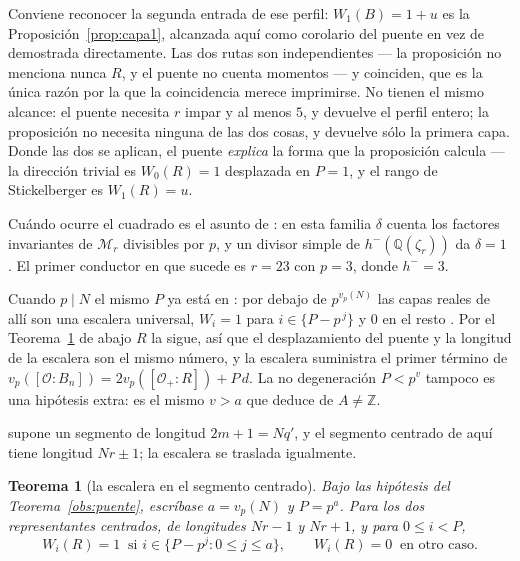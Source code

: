 \documentclass[11pt,a4paper]{article}
\newtheorem{theorem}{Teorema}
\theoremstyle{definition}
\newcommand{\ZZ}{\mathbb{Z}}
\newcommand{\QQ}{\mathbb{Q}}
\newcommand{\cO}{\mathcal{O}}
\begin{document}
Conviene reconocer la segunda entrada de ese perfil: $W_1(B)=1+u$ es la
Proposici\'on~\ref{prop:capa1}, alcanzada aqu\'i como corolario del puente en vez de demostrada
directamente. Las dos rutas son independientes --- la proposici\'on no menciona nunca $R$, y el
puente no cuenta momentos --- y coinciden, que es la \'unica raz\'on por la que la coincidencia
merece imprimirse. No tienen el mismo alcance: el puente necesita $r$ impar y al menos $5$, y
devuelve el perfil entero; la proposici\'on no necesita ninguna de las dos cosas, y devuelve s\'olo
la primera capa. Donde las dos se aplican, el puente \emph{explica} la forma que la proposici\'on
calcula --- la direcci\'on trivial es $W_0(R)=1$ desplazada en $P=1$, y el rango de Stickelberger
es $W_1(R)=u$.

Cu\'ando ocurre el cuadrado es el asunto de \cite[Thm.~12]{Cond}: en esta familia $\delta$ cuenta
los factores invariantes de $\mathcal M_r$ divisibles por $p$, y un divisor simple de
$h^-(\QQ(\zeta_r))$ da $\delta=1$ \cite[Cor.~16]{Cond}. El primer conductor en que sucede es $r=23$ con $p=3$, donde
$h^-=3$.

Cuando $p\mid N$ el mismo $P$ ya est\'a en \cite{Cond}: por debajo de $p^{v_p(N)}$ las capas reales
de all\'i son una escalera universal, $W_i=1$ para $i\in\{P-p^{\,j}\}$ y $0$ en el resto
\cite[Prop.~19]{Cond}. Por el Teorema~\ref{thm:escalera} de abajo $R$ la sigue, as\'i que el desplazamiento del puente y
la longitud de la escalera
son el mismo n\'umero, y la escalera suministra el primer t\'ermino de
$v_p([\cO:B_n])=2v_p([\cO_+:R])+P\,d$. La no degeneraci\'on $P<p^v$ tampoco es una hip\'otesis
extra: es el mismo $v>a$ que \cite[Prop.~19]{Cond} deduce de $A\ne\ZZ$.

\cite[Prop.~19]{Cond} supone un segmento de longitud $2m+1=Nq'$, y el segmento centrado de aqu\'i
tiene longitud $Nr\pm1$; la escalera se traslada igualmente.

\begin{theorem}[la escalera en el segmento centrado]\label{thm:escalera}
Bajo las hip\'otesis del Teorema~\ref{obs:puente}, escr\'ibase $a=v_p(N)$ y $P=p^a$. Para los dos
representantes centrados, de longitudes $Nr-1$ y $Nr+1$, y para $0\le i<P$,
\[
W_i(R)=1\ \text{ si } i\in\{P-p^j:0\le j\le a\},\qquad W_i(R)=0\ \text{ en otro caso.}
\]
\end{theorem}
\end{document}
